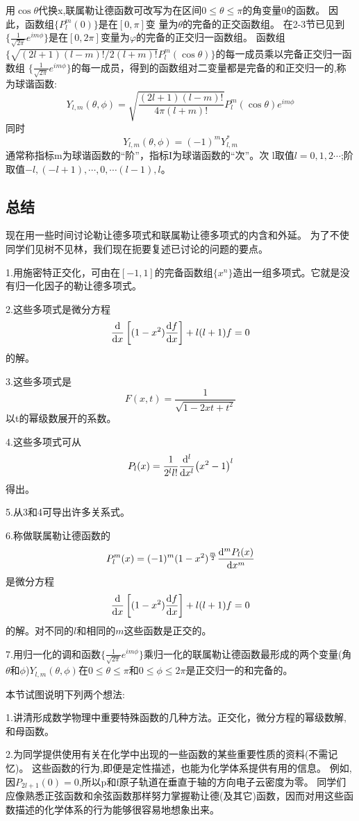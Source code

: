 用$\cos \theta$代换x,联属勒让德函数可改写为在区间$0≤\theta≤\pi$的角变量$0$的函数。
因此，函数组$\{P_l^m(0)\}$是在$[0,π]$变 量为$θ$的完备的正交函数组。
在2-3节已见到$\{\frac{1}{\sqrt{2\pi}}e^{im\phi}\}$是在$[0,2\pi]$变量为$φ$的完备的正交归一函数组。
函数组$\{\sqrt{(2l+1)(l-m)!/2(l+m)!}P_l^m(\cos \theta)\}$的每一成员乘以完备正交归一函数组
$\{\frac{1}{\sqrt{2\pi}}e^{im\phi}\}$的每一成员，得到的函数组对二变量都是完备的和正交归一的,称为球谐函数:
\[Y_{l,m}(\theta,\phi)=\sqrt{\frac{(2l+1)(l-m)!}{4\pi(l+m)!}}P_l^m(\cos \theta)e^{im\phi} \tag{2-111}\]
同时
\[Y_{l,m}(\theta,\phi)=(-1)^mY_{l,m}^* \tag{2-112}\]
通常称指标m为球谐函数的“阶”，指标I为球谐函数的“次”。次
l取值$l=0,1,2 \cdots$;阶取值$-l,(-l+1),\cdots ,0, \cdots (l-1),l$。
\subsection*{总结}
现在用一些时间讨论勒让德多项式和联属勒让德多项式的内含和外延。
为了不使同学们见树不见林，我们现在扼要复述已讨论的问题的要点。

1.用施密特正交化，可由在$[-1,1]$的完备函数组$\{x^n\}$造出一组多项式。它就是没有归一化因子的勒让德多项式。

2.这些多项式是微分方程
\[\dv{x}\left[(1-x^2)\dv{f}{x}\right]+l(l+1)f=0\]
的解。

3.这些多项式是
\[F(x,t)=\frac{1}{\sqrt{1-2xt+t^2}}\]
以t的幂级数展开的系数。

4.这些多项式可从
\[P_l(x)=\frac{1}{2^ll!}\dv[l]{x}(x^2-1)^l\]
得出。

5.从3和4可导出许多关系式。

6.称做联属勒让德函数的
\[P_l^m(x)=(-1)^m(1-x^2)^{\frac{m}{2}}\dv[m]{P_l(x)}{x}\]
是微分方程
\[\dv{x}\left[(1-x^2)\dv{f}{x}\right]+l(l+1)f=0\]
的解。对不同的$l$和相同的$m$这些函数是正交的。

7.用归一化的调和函数$\{\frac{1}{\sqrt{2\pi}}e^{im\phi}\}$乘归一化的联属勒让德函数最形成的两个变量(角$\theta$和$\phi$)$Y_{l,m}(\theta,\phi)$在$0 \leq \theta \leq \pi$和$0≤\phi≤2\pi$是正交归一的和完备的。

本节试图说明下列两个想法:

1.讲清形成数学物理中重要特殊函数的几种方法。正交化，微分方程的幂级数解,和母函数。

2.为同学提供使用有关在化学中出现的一些函数的某些重要性质的资料(不需记忆)。
这些函数的行为,即便是定性描述，也能为化学体系提供有用的信息。
例如,因$P_{2l+1}(0)=0$,所以p和f原子轨道在垂直于轴的方向电子云密度为零。
同学们应像熟悉正弦函数和余弦函数那样努力掌握勒让德(及其它)函数，因而对用这些函数描述的化学体系的行为能够很容易地想象出来。

